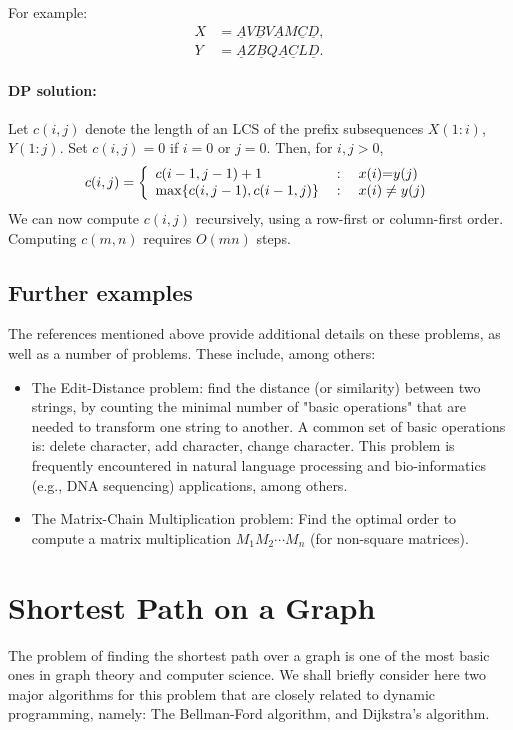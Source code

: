 For example:
\begin{equation*}
    \begin{split}
       X &= \underline{A}V\underline{B}V\underline{A}M\underline{C}\underline{D}, \\
       Y &= \underline{A}Z\underline{B}Q\underline{A}\underline{C}L\underline{D}.
     \end{split}
\end{equation*}
\paragraph{DP solution:}
Let  $c(i,j)$ denote the length of an LCS of  the prefix subsequences $X(1:i)$, $Y(1:j)$. Set $c(i,j) = 0$ if $i = 0$ or $j = 0$. Then, for $i,j > 0$,
\[c(i,j) = \left\{ {\begin{array}{*{20}{l}}
{c(i - 1,j - 1) + 1}&{\;:\quad x(i){\rm{ = }}y(j){\rm{  }}}\\
{\max \{ c(i,j - 1),c(i - 1,j)\} }&{\;:\quad x(i) \ne y(j)}
\end{array}} \right.\]
We can now compute $c(i,j)$  recursively, using a row-first or column-first order. Computing $c(m,n)$  requires $O(mn)$ steps.

\subsection{Further examples}
The references mentioned above provide additional details on these problems, as well as a number of problems. These include, among others:
\begin{itemize}
  \item The Edit-Distance problem: find the distance (or similarity) between two strings, by counting the minimal number of "basic operations" that are needed to transform one string to another. A common set of basic operations is: delete character, add character, change character. This problem is frequently encountered in natural language processing and bio-informatics (e.g., DNA sequencing) applications, among others.
  \item The Matrix-Chain Multiplication problem: Find the optimal order to compute a matrix multiplication  ${M_1}{M_2} \cdots {M_n}$  (for non-square matrices).
\end{itemize}

\section{Shortest Path on a Graph}
The problem of finding the shortest path over a graph is one of the most basic ones in graph theory and computer science. We shall briefly consider here two major algorithms for this problem that are closely related to dynamic programming, namely: The Bellman-Ford algorithm, and Dijkstra's algorithm.

